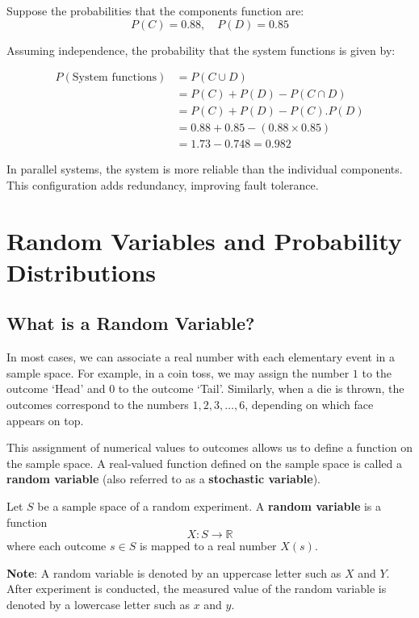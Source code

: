 \documentclass[twoside]{book}
\begin{document}
\begin{itemize}
\begin{center}
\end{center}

Suppose the probabilities that the components function are:
\[
P(C) = 0.88, \quad P(D) = 0.85
\]

Assuming independence, the probability that the system functions is given by:

\[
\begin{aligned}
P(\text{System functions}) &= P(C \cup D) \\
&= P(C) + P(D) - P(C \cap D) \\
&= P(C) + P(D) - P(C).P(D) \\
&= 0.88 + 0.85 - (0.88 \times 0.85) \\
&= 1.73 - 0.748 = 0.982
\end{aligned}
\]

In parallel systems, the system is more reliable than the individual components. This configuration adds redundancy, improving fault tolerance.
\end{itemize}

\chapter{Random Variables and Probability Distributions}
\section{What is a Random Variable?}
In most cases, we can associate a real number with each elementary event in a sample space. For example, in a coin toss, we may assign the number \(1\) to the outcome `Head' and \(0\) to the outcome `Tail'. Similarly, when a die is thrown, the outcomes correspond to the numbers \(1, 2, 3, \dots, 6\), depending on which face appears on top.

This assignment of numerical values to outcomes allows us to define a function on the sample space. A real-valued function defined on the sample space is called a \textbf{random variable} (also referred to as a \textbf{stochastic variable}).

\begin{textbox}
    Let \( S \) be a sample space of a random experiment. A \textbf{random variable} is a function  
\[
X : S \rightarrow \mathbb{R}
\]
where each outcome \( s \in S \) is mapped to a real number \( X(s) \).

\end{textbox}
\textbf{Note}: A random variable is denoted by an uppercase letter such as $X$ and $Y$. After experiment is conducted, the measured value of the random variable is denoted by a lowercase letter such as $x$
and $y$.
\end{document}
